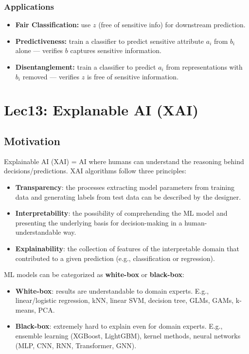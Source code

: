 \documentclass[UTF8]{ctexart}
\begin{document}
\subsubsection{Applications}
\begin{itemize}
    \item \textbf{Fair Classification:} use $z$ (free of sensitive info) for downstream prediction.
    \item \textbf{Predictiveness:} train a classifier to predict sensitive attribute $a_i$ from $b_i$ alone — verifies $b$ captures sensitive information.
    \item \textbf{Disentanglement:} train a classifier to predict $a_i$ from representations with $b_i$ removed — verifies $z$ is free of sensitive information.
\end{itemize}

\section{Lec13: Explanable AI (XAI)}
\subsection{Motivation}

Explainable AI (XAI) = AI where humans can understand the reasoning behind decisions/predictions. XAI algorithms follow three principles:
\begin{itemize}
    \item \textbf{Transparency}: the processes extracting model parameters from training data and generating labels from test data can be described by the designer.
    \item \textbf{Interpretability}: the possibility of comprehending the ML model and presenting the underlying basis for decision-making in a human-understandable way.
    \item \textbf{Explainability}: the collection of features of the interpretable domain that contributed to a given prediction (e.g., classification or regression).
\end{itemize}

ML models can be categorized as \textbf{white-box} or \textbf{black-box}:
\begin{itemize}
    \item \textbf{White-box}: results are understandable to domain experts. E.g., linear/logistic regression, kNN, linear SVM, decision tree, GLMs, GAMs, k-means, PCA.
    \item \textbf{Black-box}: extremely hard to explain even for domain experts. E.g., ensemble learning (XGBoost, LightGBM), kernel methods, neural networks (MLP, CNN, RNN, Transformer, GNN).
\end{itemize}
\end{document}
